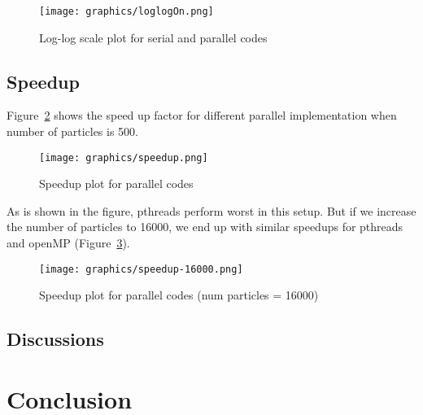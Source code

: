 \documentclass[11pt]{article}
\begin{document}
\begin{figure}[htb]
  \centering
  \texttt{[image: graphics/loglogOn.png]}
  \caption{Log-log scale plot for serial and parallel codes}
  \label{fig:loglogOn}
\end{figure}

\subsection{Speedup}
Figure~\ref{fig:speedup} shows the speed up factor for different parallel implementation when number of particles is 500.
\begin{figure}[htb]
  \centering
  \texttt{[image: graphics/speedup.png]}
  \caption{Speedup plot for parallel codes}
  \label{fig:speedup}
\end{figure}
As is shown in the figure, pthreads perform worst in this setup. But if we increase the number of particles to 16000,
we end up with similar speedups for pthreads and openMP (Figure~\ref{fig:speedup-16000}).
\begin{figure}[htb]
  \centering
  \texttt{[image: graphics/speedup-16000.png]}
  \caption{Speedup plot for parallel codes (num particles = 16000)}
  \label{fig:speedup-16000}
\end{figure}

\subsection{Discussions}

\section{Conclusion}




\end{document}
